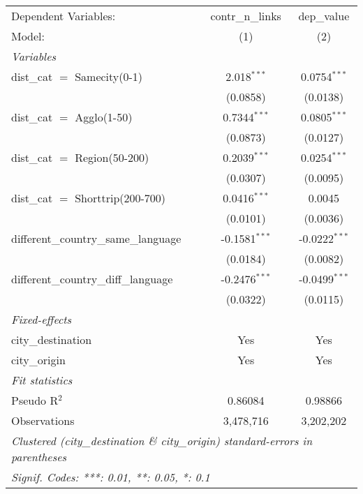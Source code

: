 
\begingroup
\centering
\begin{tabular}{lcc}
   \tabularnewline \midrule \midrule
   Dependent Variables:                  & contr\_n\_links   & dep\_value\\   
   Model:                                & (1)               & (2)\\  
   \midrule
   \emph{Variables}\\
   dist\_cat $=$ Samecity(0-1)           & 2.018$^{***}$     & 0.0754$^{***}$\\   
                                         & (0.0858)          & (0.0138)\\   
   dist\_cat $=$ Agglo(1-50)             & 0.7344$^{***}$    & 0.0805$^{***}$\\   
                                         & (0.0873)          & (0.0127)\\   
   dist\_cat $=$ Region(50-200)          & 0.2039$^{***}$    & 0.0254$^{***}$\\   
                                         & (0.0307)          & (0.0095)\\   
   dist\_cat $=$ Shorttrip(200-700)      & 0.0416$^{***}$    & 0.0045\\   
                                         & (0.0101)          & (0.0036)\\   
   different\_country\_same\_language    & -0.1581$^{***}$   & -0.0222$^{***}$\\   
                                         & (0.0184)          & (0.0082)\\   
   different\_country\_diff\_language    & -0.2476$^{***}$   & -0.0499$^{***}$\\   
                                         & (0.0322)          & (0.0115)\\   
   \midrule
   \emph{Fixed-effects}\\
   city\_destination                     & Yes               & Yes\\  
   city\_origin                          & Yes               & Yes\\  
   \midrule
   \emph{Fit statistics}\\
   Pseudo R$^2$                          & 0.86084           & 0.98866\\  
   Observations                          & 3,478,716         & 3,202,202\\  
   \midrule \midrule
   \multicolumn{3}{l}{\emph{Clustered (city\_destination \& city\_origin) standard-errors in parentheses}}\\
   \multicolumn{3}{l}{\emph{Signif. Codes: ***: 0.01, **: 0.05, *: 0.1}}\\
\end{tabular}
\par\endgroup


